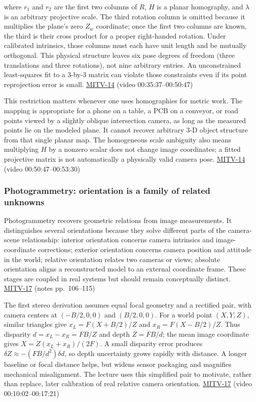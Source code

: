 where \(r_1\) and \(r_2\) are the first two columns of \(R\), \(H\) is a planar homography, and \(\lambda\) is an arbitrary projective scale. The third rotation column is omitted because it multiplies the plane's zero \(Z_w\) coordinate; once the first two columns are known, the third is their cross product for a proper right-handed rotation. Under calibrated intrinsics, those columns must each have unit length and be mutually orthogonal. This physical structure leaves six pose degrees of freedom (three translations and three rotations), not nine arbitrary entries. An unconstrained least-squares fit to a 3-by-3 matrix can violate those constraints even if its point reprojection error is small. \hyperref[04-visual-computing-ii-ch036]{MITV-14} (video 00:35:37--00:50:47)

This restriction matters whenever one uses homographies for metric work. The mapping is appropriate for a phone on a table, a PCB on a conveyor, or road points viewed by a slightly oblique intersection camera, as long as the measured points lie on the modeled plane. It cannot recover arbitrary 3-D object structure from that single planar map. The homogeneous scale ambiguity also means multiplying \(H\) by a nonzero scalar does not change image coordinates; a fitted projective matrix is not automatically a physically valid camera pose. \hyperref[04-visual-computing-ii-ch036]{MITV-14} (video 00:50:47--00:53:30)

\subsubsection{Photogrammetry: orientation is a family of related unknowns}\label{photogrammetry-orientation-is-a-family-of-related-unknowns}

Photogrammetry recovers geometric relations from image measurements. It distinguishes several orientations because they solve different parts of the camera-scene relationship: interior orientation concerns camera intrinsics and image-coordinate corrections; exterior orientation concerns camera position and attitude in the world; relative orientation relates two cameras or views; absolute orientation aligns a reconstructed model to an external coordinate frame. These stages are coupled in real systems but should remain conceptually distinct. \hyperref[04-visual-computing-ii-ch036]{MITV-17} (notes pp.~106--115)

The first stereo derivation assumes equal focal geometry and a rectified pair, with camera centers at \((-B/2,0,0)\) and \((B/2,0,0)\). For a world point \((X,Y,Z)\), similar triangles give \(x_L=F(X+B/2)/Z\) and \(x_R=F(X-B/2)/Z\). Thus disparity \(d=x_L-x_R=FB/Z\) and depth \(Z=FB/d\); the mean image coordinate gives \(X=Z(x_L+x_R)/(2F)\). A small disparity error produces \(\delta Z\approx-(FB/d^2)\delta d\), so depth uncertainty grows rapidly with distance. A longer baseline or focal distance helps, but widens sensor packaging and magnifies mechanical misalignment. The lecture uses this simplified pair to motivate, rather than replace, later calibration of real relative camera orientation. \hyperref[04-visual-computing-ii-ch036]{MITV-17} (video 00:10:02--00:17:21)

